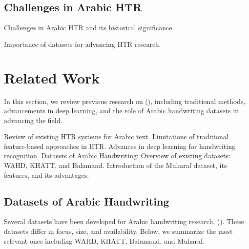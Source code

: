 \documentclass[conference]{IEEEtran}
\begin{document}
\subsection{Challenges in Arabic HTR}

Challenges in Arabic HTR and its historical significance.



Importance of datasets for advancing HTR research.


 
\section{Related Work}
In this section, we review previous research on (), including traditional methods, advancements in deep learning, and the role of Arabic handwriting datasets in advancing the field.

Review of existing HTR systems for Arabic text.
Limitations of traditional feature-based approaches in HTR.
Advances in deep learning for handwriting recognition.
Datasets of Arabic Handwriting:
Overview of existing datasets: WAHD, KHATT, and Balamand.
Introduction of the Muharaf dataset, its features, and its advantages.


\blindtext[3]

\subsection{}



\subsection{}





\subsection{Datasets of Arabic Handwriting}

Several datasets have been developed for Arabic handwriting research, (). These datasets differ in focus, size, and availability. Below, we summarize the most relevant ones including WAHD, KHATT, Balamand, and Muharaf.
\end{document}
